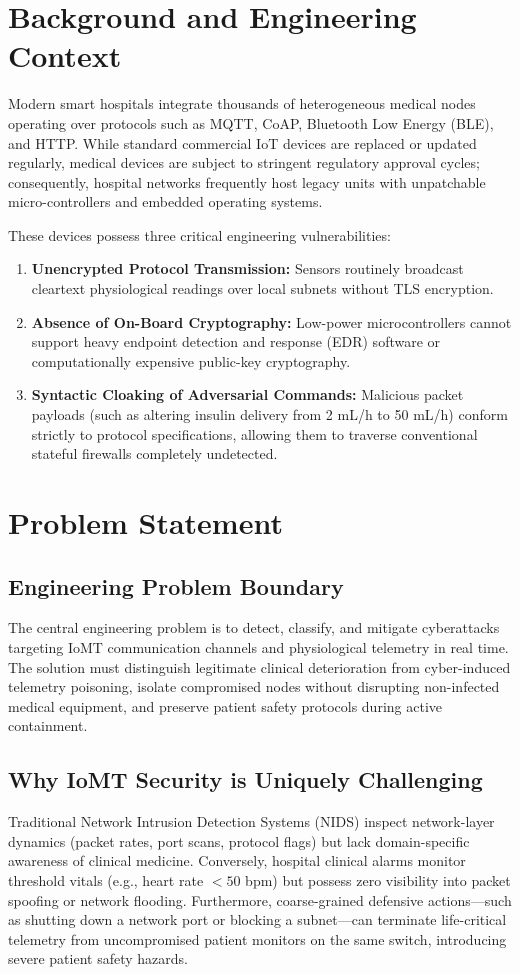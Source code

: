 \documentclass[12pt,a4paper]{report}
\begin{document}
\section{Background and Engineering Context}
Modern smart hospitals integrate thousands of heterogeneous medical nodes operating over protocols such as MQTT, CoAP, Bluetooth Low Energy (BLE), and HTTP. While standard commercial IoT devices are replaced or updated regularly, medical devices are subject to stringent regulatory approval cycles; consequently, hospital networks frequently host legacy units with unpatchable micro-controllers and embedded operating systems. 

These devices possess three critical engineering vulnerabilities:
\begin{enumerate}
    \item \textbf{Unencrypted Protocol Transmission:} Sensors routinely broadcast cleartext physiological readings over local subnets without TLS encryption.
    \item \textbf{Absence of On-Board Cryptography:} Low-power microcontrollers cannot support heavy endpoint detection and response (EDR) software or computationally expensive public-key cryptography.
    \item \textbf{Syntactic Cloaking of Adversarial Commands:} Malicious packet payloads (such as altering insulin delivery from 2 mL/h to 50 mL/h) conform strictly to protocol specifications, allowing them to traverse conventional stateful firewalls completely undetected.
\end{enumerate}

\section{Problem Statement}
\subsection{Engineering Problem Boundary}
The central engineering problem is to detect, classify, and mitigate cyberattacks targeting IoMT communication channels and physiological telemetry in real time. The solution must distinguish legitimate clinical deterioration from cyber-induced telemetry poisoning, isolate compromised nodes without disrupting non-infected medical equipment, and preserve patient safety protocols during active containment.

\subsection{Why IoMT Security is Uniquely Challenging}
Traditional Network Intrusion Detection Systems (NIDS) inspect network-layer dynamics (packet rates, port scans, protocol flags) but lack domain-specific awareness of clinical medicine. Conversely, hospital clinical alarms monitor threshold vitals (e.g., heart rate $< 50$ bpm) but possess zero visibility into packet spoofing or network flooding. Furthermore, coarse-grained defensive actions---such as shutting down a network port or blocking a subnet---can terminate life-critical telemetry from uncompromised patient monitors on the same switch, introducing severe patient safety hazards.
\end{document}
